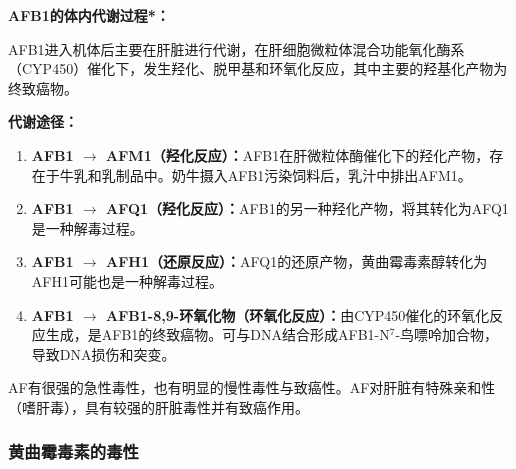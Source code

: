 \begin{keybox}
\textbf{AFB1的体内代谢过程*\difficulty：}

AFB1进入机体后主要在肝脏进行代谢，在肝细胞微粒体混合功能氧化酶系（CYP450）催化下，发生羟化、脱甲基和环氧化反应，其中主要的羟基化产物为终致癌物。

\textbf{代谢途径：}
\begin{enumerate}[leftmargin=*]
    \item \textbf{AFB1 $\rightarrow$ AFM1（羟化反应）：}AFB1在肝微粒体酶催化下的羟化产物，存在于牛乳和乳制品中。奶牛摄入AFB1污染饲料后，乳汁中排出AFM1。
    \item \textbf{AFB1 $\rightarrow$ AFQ1（羟化反应）：}AFB1的另一种羟化产物，将其转化为AFQ1是一种解毒过程。
    \item \textbf{AFB1 $\rightarrow$ AFH1（还原反应）：}AFQ1的还原产物，黄曲霉毒素醇转化为AFH1可能也是一种解毒过程。
    \item \textbf{AFB1 $\rightarrow$ AFB1-8,9-环氧化物（环氧化反应）：}由CYP450催化的环氧化反应生成，是AFB1的终致癌物。可与DNA结合形成AFB1-N$^7$-鸟嘌呤加合物，导致DNA损伤和突变。%
\end{enumerate}

AF有很强的急性毒性，也有明显的慢性毒性与致癌性。AF对肝脏有特殊亲和性（嗜肝毒），具有较强的肝脏毒性并有致癌作用。
\end{keybox}

\subsubsection{黄曲霉毒素的毒性}

